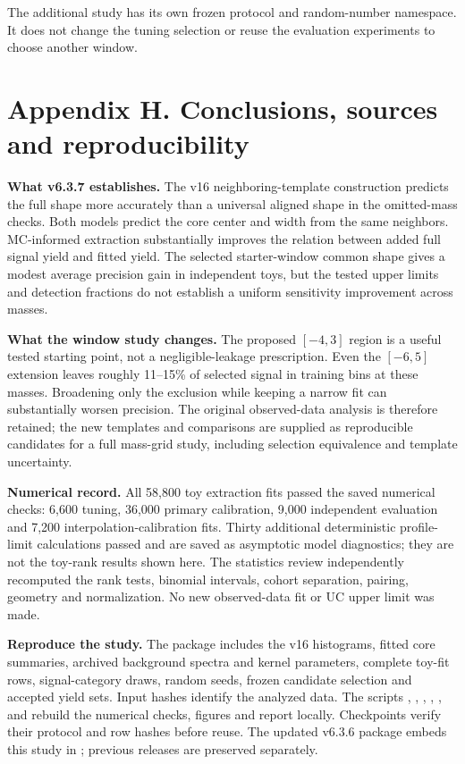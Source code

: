 \documentclass[11pt]{article}
\begin{document}
The additional study has its own frozen protocol and random-number namespace. It does not change the tuning selection or reuse the evaluation experiments to choose another window.
\clearpage\section*{Appendix H. Conclusions, sources and reproducibility}

\textbf{What v6.3.7 establishes.} The v16 neighboring-template construction predicts the full shape more accurately than a universal aligned shape in the omitted-mass checks. Both models predict the core center and width from the same neighbors. MC-informed extraction substantially improves the relation between added full signal yield and fitted yield. The selected starter-window common shape gives a modest average precision gain in independent toys, but the tested upper limits and detection fractions do not establish a uniform sensitivity improvement across masses.

\textbf{What the window study changes.} The proposed $[-4,3]$ region is a useful tested starting point, not a negligible-leakage prescription. Even the $[-6,5]$ extension leaves roughly 11--15\% of selected signal in training bins at these masses. Broadening only the exclusion while keeping a narrow fit can substantially worsen precision. The original observed-data analysis is therefore retained; the new templates and comparisons are supplied as reproducible candidates for a full mass-grid study, including selection equivalence and template uncertainty.

\textbf{Numerical record.} All 58,800 toy extraction fits passed the saved numerical checks: 6,600 tuning, 36,000 primary calibration, 9,000 independent evaluation and 7,200 interpolation-calibration fits. Thirty additional deterministic profile-limit calculations passed and are saved as asymptotic model diagnostics; they are not the toy-rank results shown here. The statistics review independently recomputed the rank tests, binomial intervals, cohort separation, pairing, geometry and normalization. No new observed-data fit or UC upper limit was made.

\textbf{Reproduce the study.} The package includes the v16 histograms, fitted core summaries, archived background spectra and kernel parameters, complete toy-fit rows, signal-category draws, random seeds, frozen candidate selection and accepted yield sets. Input hashes identify the analyzed data. The scripts , , , , ,  and  rebuild the numerical checks, figures and report locally. Checkpoints verify their protocol and row hashes before reuse. The updated v6.3.6 package embeds this study in ; previous releases are preserved separately.
\end{document}
